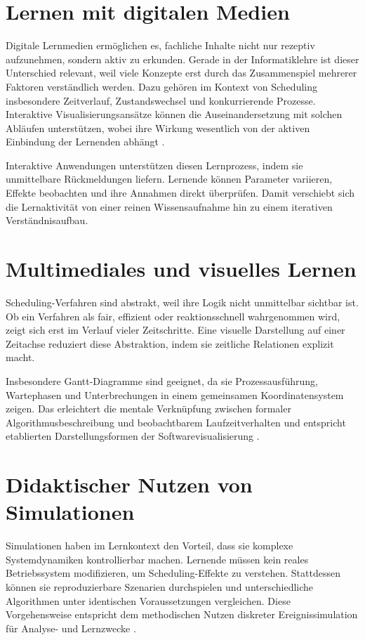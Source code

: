 \section{Lernen mit digitalen Medien}

Digitale Lernmedien ermöglichen es, fachliche Inhalte nicht nur rezeptiv aufzunehmen, sondern aktiv zu erkunden. Gerade in der Informatiklehre ist dieser Unterschied relevant, weil viele Konzepte erst durch das Zusammenspiel mehrerer Faktoren verständlich werden. Dazu gehören im Kontext von Scheduling insbesondere Zeitverlauf, Zustandswechsel und konkurrierende Prozesse. Interaktive Visualisierungsansätze können die Auseinandersetzung mit solchen Abläufen unterstützen, wobei ihre Wirkung wesentlich von der aktiven Einbindung der Lernenden abhängt \cite{hundhausen2002meta,naps2002engagement,stasko1998software}.

Interaktive Anwendungen unterstützen diesen Lernprozess, indem sie unmittelbare Rückmeldungen liefern. Lernende können Parameter variieren, Effekte beobachten und ihre Annahmen direkt überprüfen. Damit verschiebt sich die Lernaktivität von einer reinen Wissensaufnahme hin zu einem iterativen Verständnisaufbau.

\section{Multimediales und visuelles Lernen}

Scheduling-Verfahren sind abstrakt, weil ihre Logik nicht unmittelbar sichtbar ist. Ob ein Verfahren als fair, effizient oder reaktionsschnell wahrgenommen wird, zeigt sich erst im Verlauf vieler Zeitschritte. Eine visuelle Darstellung auf einer Zeitachse reduziert diese Abstraktion, indem sie zeitliche Relationen explizit macht.

Insbesondere Gantt-Diagramme sind geeignet, da sie Prozessausführung, Wartephasen und Unterbrechungen in einem gemeinsamen Koordinatensystem zeigen. Das erleichtert die mentale Verknüpfung zwischen formaler Algorithmusbeschreibung und beobachtbarem Laufzeitverhalten und entspricht etablierten Darstellungsformen der Softwarevisualisierung \cite{stasko1998software}.

\section{Didaktischer Nutzen von Simulationen}

Simulationen haben im Lernkontext den Vorteil, dass sie komplexe Systemdynamiken kontrollierbar machen. Lernende müssen kein reales Betriebssystem modifizieren, um Scheduling-Effekte zu verstehen. Stattdessen können sie reproduzierbare Szenarien durchspielen und unterschiedliche Algorithmen unter identischen Voraussetzungen vergleichen. Diese Vorgehensweise entspricht dem methodischen Nutzen diskreter Ereignissimulation für Analyse- und Lernzwecke \cite{banks2010discrete}.

